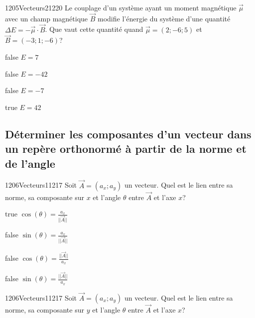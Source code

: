 \documentclass[11pt]{article}
\begin{document}
            \begin{question}{1205}{Vecteurs}{2}{1220}
                Le couplage d'un système ayant un moment magnétique $\vec{\mu}$ avec un champ magnétique $\vec{B}$ modifie l'énergie du système d'une quantité $\Delta E=-\vec{\mu}\cdot\vec{B}$. Que vaut cette quantité quand $\vec{\mu}=(2;-6;5)$ et $\vec{B}=(-3;1;-6)$?
            \end{question}

            \begin{reponses}
                \item[false] $E=7$
                \item[false] $E=-42$
                \item[false] $E=-7$
                \item[true] $E=42$
            \end{reponses}

        \subsection{Déterminer les composantes d'un vecteur dans un repère orthonormé à partir de la norme et de l'angle}
        
        	\begin{question}{1206}{Vecteurs}{1}{1217}
				Soit $\vec{A}=(a_x;a_y)$ un vecteur. Quel est le lien entre sa norme, sa composante sur $x$ et l'angle $\theta$ entre $\vec{A}$ et l'axe $x$?
            \end{question}

            \begin{reponses}
            	\item[true] $\cos(\theta)=\frac{a_x}{||\vec{A}||}$
            	\item[false] $\sin(\theta)=\frac{a_x}{||\vec{A}||}$
                \item[false] $\cos(\theta)=\frac{||\vec{A}||}{a_x}$
                \item[false] $\sin(\theta)=\frac{||\vec{A}||}{a_x}$
            \end{reponses}
        
        	\begin{question}{1206}{Vecteurs}{1}{1217}
				Soit $\vec{A}=(a_x;a_y)$ un vecteur. Quel est le lien entre sa norme, sa composante sur $y$ et l'angle $\theta$ entre $\vec{A}$ et l'axe $x$?
            \end{question}
\end{document}
